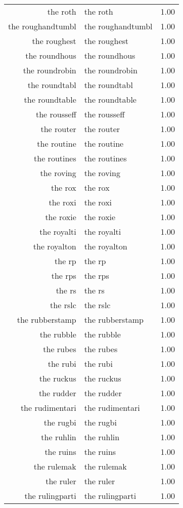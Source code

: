 \begin{table}[ht]
\begin{tabular}{rlr}
  the roth & the roth & 1.00 \\ 
  the roughandtumbl & the roughandtumbl & 1.00 \\ 
  the roughest & the roughest & 1.00 \\ 
  the roundhous & the roundhous & 1.00 \\ 
  the roundrobin & the roundrobin & 1.00 \\ 
  the roundtabl & the roundtabl & 1.00 \\ 
  the roundtable & the roundtable & 1.00 \\ 
  the rousseff & the rousseff & 1.00 \\ 
  the router & the router & 1.00 \\ 
  the routine & the routine & 1.00 \\ 
  the routines & the routines & 1.00 \\ 
  the roving & the roving & 1.00 \\ 
  the rox & the rox & 1.00 \\ 
  the roxi & the roxi & 1.00 \\ 
  the roxie & the roxie & 1.00 \\ 
  the royalti & the royalti & 1.00 \\ 
  the royalton & the royalton & 1.00 \\ 
  the rp & the rp & 1.00 \\ 
  the rps & the rps & 1.00 \\ 
  the rs & the rs & 1.00 \\ 
  the rslc & the rslc & 1.00 \\ 
  the rubberstamp & the rubberstamp & 1.00 \\ 
  the rubble & the rubble & 1.00 \\ 
  the rubes & the rubes & 1.00 \\ 
  the rubi & the rubi & 1.00 \\ 
  the ruckus & the ruckus & 1.00 \\ 
  the rudder & the rudder & 1.00 \\ 
  the rudimentari & the rudimentari & 1.00 \\ 
  the rugbi & the rugbi & 1.00 \\ 
  the ruhlin & the ruhlin & 1.00 \\ 
  the ruins & the ruins & 1.00 \\ 
  the rulemak & the rulemak & 1.00 \\ 
  the ruler & the ruler & 1.00 \\ 
  the rulingparti & the rulingparti & 1.00 \\ 

\end{tabular}
\end{table}
